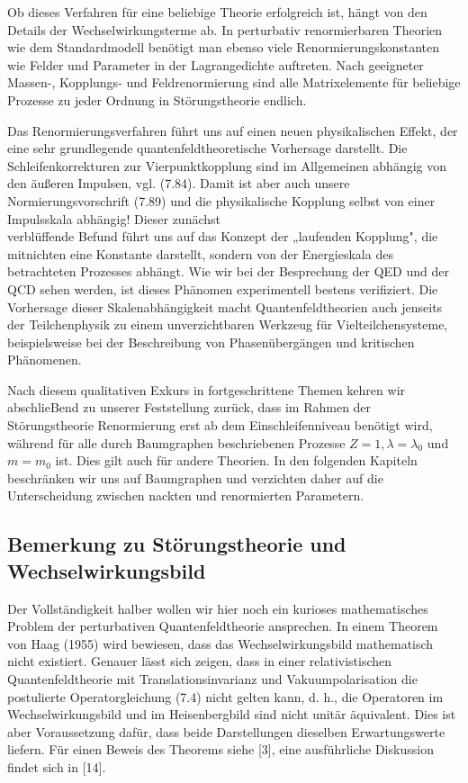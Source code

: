 \documentclass[10pt, letterpaper]{article}
\begin{document}
Ob dieses Verfahren für eine beliebige Theorie erfolgreich ist, hängt von den Details der Wechselwirkungsterme ab. In perturbativ renormierbaren Theorien wie dem Standardmodell benötigt man ebenso viele Renormierungskonstanten wie Felder und Parameter in der Lagrangedichte auftreten. Nach geeigneter Massen-, Kopplungs- und Feldrenormierung sind alle Matrixelemente für beliebige Prozesse zu jeder Ordnung in Störungstheorie endlich.

Das Renormierungsverfahren führt uns auf einen neuen physikalischen Effekt, der eine sehr grundlegende quantenfeldtheoretische Vorhersage darstellt. Die Schleifenkorrekturen zur Vierpunktkopplung sind im Allgemeinen abhängig von den äußeren Impulsen, vgl. (7.84). Damit ist aber auch unsere Normierungsvorschrift (7.89) und die physikalische Kopplung selbst von einer Impulsskala abhängig! Dieser zunächst\\
verblüffende Befund führt uns auf das Konzept der „laufenden Kopplung", die mitnichten eine Konstante darstellt, sondern von der Energieskala des betrachteten Prozesses abhängt. Wie wir bei der Besprechung der QED und der QCD sehen werden, ist dieses Phänomen experimentell bestens verifiziert. Die Vorhersage dieser Skalenabhängigkeit macht Quantenfeldtheorien auch jenseits der Teilchenphysik zu einem unverzichtbaren Werkzeug für Vielteilchensysteme, beispielsweise bei der Beschreibung von Phasenübergängen und kritischen Phänomenen.

Nach diesem qualitativen Exkurs in fortgeschrittene Themen kehren wir abschlieBend zu unserer Feststellung zurück, dass im Rahmen der Störungstheorie Renormierung erst ab dem Einschleifenniveau benötigt wird, während für alle durch Baumgraphen beschriebenen Prozesse $Z=1, \lambda=\lambda_{0}$ und $m=m_{0}$ ist. Dies gilt auch für andere Theorien. In den folgenden Kapiteln beschränken wir uns auf Baumgraphen und verzichten daher auf die Unterscheidung zwischen nackten und renormierten Parametern.

\subsection*{Bemerkung zu Störungstheorie und Wechselwirkungsbild}
Der Vollständigkeit halber wollen wir hier noch ein kurioses mathematisches Problem der perturbativen Quantenfeldtheorie ansprechen. In einem Theorem von Haag (1955) wird bewiesen, dass das Wechselwirkungsbild mathematisch nicht existiert. Genauer lässt sich zeigen, dass in einer relativistischen Quantenfeldtheorie mit Translationsinvarianz und Vakuumpolarisation die postulierte Operatorgleichung (7.4) nicht gelten kann, d. h., die Operatoren im Wechselwirkungsbild und im Heisenbergbild sind nicht unitär äquivalent. Dies ist aber Voraussetzung dafür, dass beide Darstellungen dieselben Erwartungswerte liefern. Für einen Beweis des Theorems siehe [3], eine ausführliche Diskussion findet sich in [14].
\end{document}
